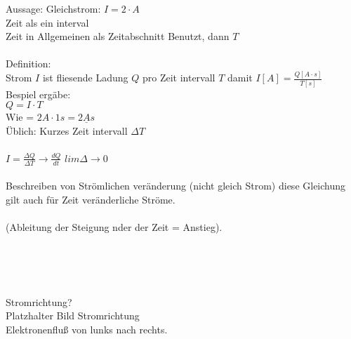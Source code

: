 Aussage: Gleichstrom: $I = 2 \cdot A$\\
Zeit als ein interval\\
Zeit in Allgemeinen als Zeitabschnitt Benutzt, dann $T$\\
\\
Definition:\\
Strom $I$ ist fliesende Ladung $Q$ pro Zeit intervall $T$ damit $ I[A] = \frac{Q[A\cdot s]}{T[s]} $\\
Bespiel ergäbe:\\
$ Q = I \cdot T$\\
Wie = $2 A \cdot 1s  = \underline{2 As} $\\
Üblich: Kurzes Zeit intervall $\Delta T$\\
\\
$ I = \frac{\Delta Q}{\Delta T} \rightarrow \frac{d Q}{d t} $  
$ lim \Delta \rightarrow 0 $ \\
\\
Beschreiben von Strömlichen veränderung (nicht gleich Strom) diese Gleichung gilt auch für Zeit veränderliche Ströme.\\
\\
(Ableitung der Steigung nder der Zeit = Anstieg).\\
\begin{figure}[h]
  \begin{center}
  \end{center}
\end{figure}
\\
\begin{figure}[h]
  \begin{center}
  \end{center}
\end{figure}\\
\\
Stromrichtung?\\
Platzhalter Bild Stromrichtung
\\
Elektronenfluß von lunks nach rechts.\\
